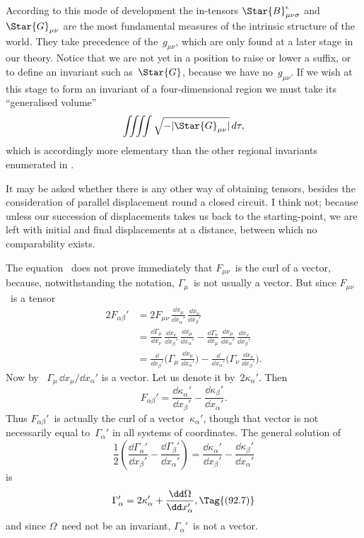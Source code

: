 \documentclass[12pt]{book}
\begin{document}
According to this mode of development the in-tensors $\Star{B}_{\mu\nu\sigma}^{\epsilon}$ and~$\Star{G}_{\mu\nu}$ are
%
the most fundamental measures of the intrinsic structure of the world. They
take precedence of the~$g_{\mu\nu}$, which are only found at a later stage in our theory.
Notice that we are not yet in a position to raise or lower a suffix, or to define
an invariant such as~$\Star{G}$, because we have no~$g_{\mu\nu}$. If we wish at this stage to
form an invariant of a four-dimensional region we must take its ``generalised
volume''
\[
\iiiint \sqrt{-|\Star{G}_{\mu\nu}|}\, d\tau,
\]
which is accordingly more elementary than the other regional invariants
enumerated in .

It may be asked whether there is any other way of obtaining tensors,
besides the consideration of parallel displacement round a closed circuit. I
think not; because unless our succession of displacements takes us back to the
starting-point, we are left with initial and final displacements at a distance,
between which no comparability exists.

The equation~ does not prove immediately that $F_{\mu\nu}$~is the curl of a
vector, because, notwithstanding the notation, $\Gamma_{\mu}$~is not usually a vector. But
since $F_{\mu\nu}$~is a tensor
\begin{align*}
  2F_{\alpha\beta}'
  &= 2F_{\mu\nu}\, \frac{\dd x_{\mu}}{\dd x_{\alpha}'}\, \frac{\dd x_{\nu}}{\dd x_{\beta}'} \\
  &= \frac{\dd\Gamma_{\mu}}{\dd x_{\nu}}\, \frac{\dd x_{\nu}}{\dd x_{\beta}'}\, \frac{\dd x_{\mu}}{\dd x_{\alpha}'}
  - \frac{\dd\Gamma_{\nu}}{\dd x_{\mu}}\, \frac{\dd x_{\mu}}{\dd x_{\alpha}'}\, \frac{\dd x_{\nu}}{\dd x_{\beta}'} \\
  &= \frac{\dd}{\dd x_{\beta}'} \biggl(\Gamma_{\mu}\, \frac{\dd x_{\mu}}{\dd x_{\alpha}'}\biggr)
  - \frac{\dd}{\dd x_{\alpha}'} \biggl(\Gamma_{\nu}\, \frac{\dd x_{\nu}}{\dd x_{\beta}'}\biggr).
\end{align*}
Now by~ $\Gamma_{\mu}\, \dd x_{\mu}/\dd x_{\alpha}'$ is a vector. Let us denote it by~$2\kappa_{\alpha}'$. Then
\[
F_{\alpha\beta}'
= \frac{\dd\kappa_{\alpha}'}{\dd x_{\beta}'} - \frac{\dd\kappa_{\beta}'}{\dd x_{\alpha}'}.
\]
Thus $F_{\alpha\beta}'$~is actually the curl of a vector~$\kappa_{\alpha}'$, though that vector is not necessarily
equal to~$\Gamma_{\alpha}'$ in all systems of coordinates. The general solution of
\[
\frac{1}{2} \left(\frac{\dd\Gamma_{\alpha}'}{\dd x_{\beta}'} - \frac{\dd\Gamma_{\beta}'}{\dd x_{\alpha}'}\right)
= \frac{\dd\kappa_{\alpha}'}{\dd x_{\beta}'} - \frac{\dd\kappa_{\beta}'}{\dd x_{\alpha}'}
\]
is
\[
\Gamma_{\alpha}' = 2\kappa_{\alpha}' + \frac{\dd\Omega}{\dd x_{\alpha}'},
\Tag{(92.7)}
\]
and since $\Omega$~need not be an invariant, $\Gamma_{\alpha}'$~is not a vector.
\end{document}
